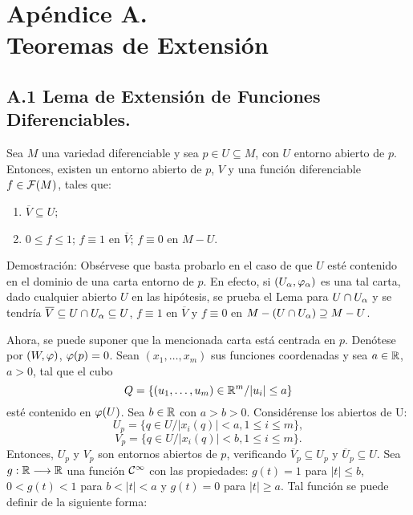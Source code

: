 \documentclass[cursovd_portada.tex]{subfiles}
\begin{document}
\chapter*{Apéndice A.\\Teoremas de Extensión}
\section*{A.1 Lema de Extensión de Funciones Diferenciables.}
\begin{lemaap}
Sea $M$ una variedad diferenciable y sea $p\in U\subseteq M$, con $U$ entorno abierto de $p$. Entonces, existen un
entorno abierto de $p$, $V$ y una función diferenciable $f\in {\cal F}(M)$, tales que:
\begin{enumerate}
\item $\overline{V}\subseteq U$;
\item $0\leq f\leq 1$; $f\equiv 1$ en $\overline{V}$; $f\equiv 0$ en $M-U$.
\end{enumerate}
\end{lemaap}
{\sc Demostración:} Obsérvese que basta probarlo en el caso de que $U$ esté contenido en el dominio de una carta
entorno de $p$. En efecto, si $(U_{\alpha}, \varphi_{\alpha})$ es una tal carta, dado cualquier abierto $U$ en las hipótesis,
se prueba el Lema para $U\cap U_{\alpha}$ y se tendría $\overline{V} \subseteq U\cap U_{\alpha}\subseteq U$, $f\equiv 1$
en $\overline{V}$ y $f\equiv 0$ en $M-(U\cap U_{\alpha})\supseteq M-U$.
\par
Ahora, se puede suponer que la mencionada carta está centrada en $p$. De\-nó\-te\-se por $(W,\varphi)$, $\varphi (p)=0$.
Sean $(x_1,\dots ,x_m)$ sus funciones coordenadas y sea $a\in \mathbb{R}$, $a>0$, tal que el cubo
$$Q=\{(u_1,\dots ,u_m)\in \mathbb{R}^m /\vert u_i \vert\leq a\}$$
esté contenido en $\varphi (U)$. Sea $b\in\mathbb{R}$ con $a>b>0$. Considérense los abiertos de U:
$$U_p=\{q\in U/\vert x_i(q) \vert <a,1\leq i\leq m\},$$
$$V_p=\{q\in U/\vert x_i(q) \vert <b,1\leq i\leq m\}.$$
\hs Entonces, $U_p$ y $V_p$ son entornos abiertos de $p$, verificando $\overline{V}_p\subseteq U_p$ y
$\overline{U}_p\subseteq U$. Sea $g:\mathbb{R}\longrightarrow \mathbb{R}$ una función ${\cal C}^{\infty}$  con las propiedades: $g(t)=1$ para
$\vert t \vert\leq b$, $0<g(t)<1$ para $b<\vert t\vert <a$ y $g(t)=0$ para $\vert t \vert\geq a$. Tal función se
puede definir de la siguiente forma:
\end{document}
